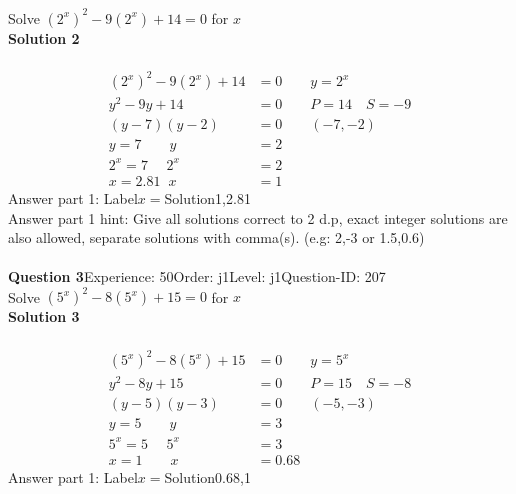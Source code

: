 \documentclass{article}
\begin{document}
Solve $(2^x)^2-9(2^x)+14=0$ for $x$\\[4pt]
\noindent\textbf{Solution 2}\\[2pt]
\\[-35pt]\begin{align*}
(2^x)^2-9(2^x)+14&=0\qquad y=2^x\\[2pt]
y^2-9y+14&=0\qquad P=14 \quad S=-9\\[2pt]
(y-7)(y-2)&=0\qquad (-7,-2)\\[2pt]
y=7 \qquad y&=2\\[2pt]
2^x=7\hspace{16pt} 2^x&=2\\[2pt]
x=2.81 \hspace{7pt} x&=1
\end{align*}
Answer part 1: \hspace{10pt}Label\hspace{10pt}$x=$\hspace{10pt}Solution\hspace{10pt}1,2.81\\
Answer part 1 hint: \hspace{15pt} Give all solutions correct to 2 d.p, exact integer solutions are also allowed, separate solutions with comma(s). (e.g: 2,-3 or 1.5,0.6)\\
\\[4pt]
\noindent\textbf{Question 3}\hspace{20pt}Experience: 50\hspace{20pt}Order: j1\hspace{20pt}Level: j1\hspace{20pt}Question-ID: 207\\[2pt]
Solve $(5^x)^2-8(5^x)+15=0$ for $x$\\[4pt]
\noindent\textbf{Solution 3}\\[2pt]
\\[-35pt]\begin{align*}
(5^x)^2-8(5^x)+15&=0\qquad y=5^x\\[2pt]
y^2-8y+15&=0\qquad P=15 \quad S=-8\\[2pt]
(y-5)(y-3)&=0\qquad (-5,-3)\\[2pt]
y=5 \qquad y&=3\\[2pt]
5^x=5\hspace{16pt} 5^x&=3\\[2pt]
x=1 \qquad x&=0.68
\end{align*}
Answer part 1: \hspace{10pt}Label\hspace{10pt}$x=$\hspace{10pt}Solution\hspace{10pt}0.68,1\\
\end{document}
